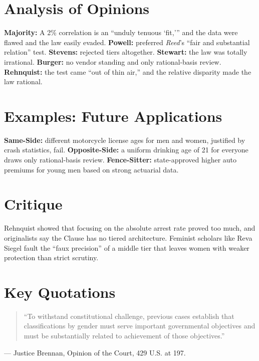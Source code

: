 \documentclass[12pt]{article}
\begin{document}
\section{Analysis of Opinions}
\textbf{Majority:} A 2\% correlation is an ``unduly tenuous `fit,''' and the data were flawed and the law easily evaded. \textbf{Powell:} preferred \textit{Reed}'s ``fair and substantial relation'' test. \textbf{Stevens:} rejected tiers altogether. \textbf{Stewart:} the law was totally irrational. \textbf{Burger:} no vendor standing and only rational-basis review. \textbf{Rehnquist:} the test came ``out of thin air,'' and the relative disparity made the law rational.

\section{Examples: Future Applications}
\textbf{Same-Side:} different motorcycle license ages for men and women, justified by crash statistics, fail. \textbf{Opposite-Side:} a uniform drinking age of 21 for everyone draws only rational-basis review. \textbf{Fence-Sitter:} state-approved higher auto premiums for young men based on strong actuarial data.

\section{Critique}
Rehnquist showed that focusing on the absolute arrest rate proved too much, and originalists say the Clause has no tiered architecture. Feminist scholars like Reva Siegel fault the ``faux precision'' of a middle tier that leaves women with weaker protection than strict scrutiny.

\section{Key Quotations}
\begin{quote}
``To withstand constitutional challenge, previous cases establish that classifications by gender must serve important governmental objectives and must be substantially related to achievement of those objectives.''
\end{quote}
\noindent --- Justice Brennan, Opinion of the Court, 429 U.S. at 197.
\end{document}
